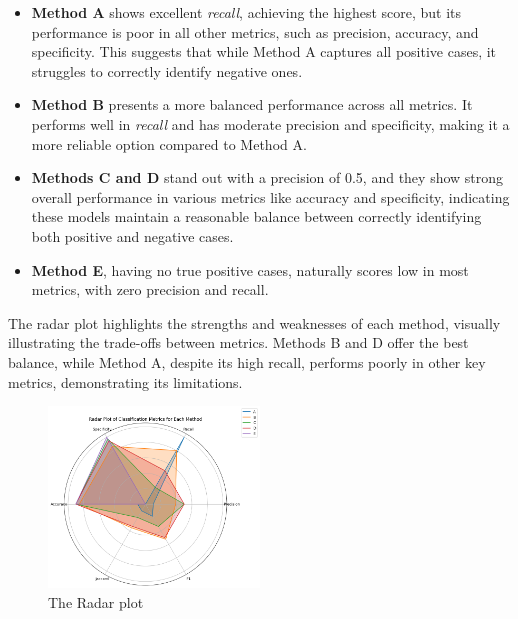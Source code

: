 \documentclass{llncs}
\begin{document}
\begin{itemize}
	\item \textbf{Method A} shows excellent \textit{recall}, achieving the highest score, but its performance is poor in all other metrics, such as precision, accuracy, and specificity. This suggests that while Method A captures all positive cases, it struggles to correctly identify negative ones.
	
	\item \textbf{Method B} presents a more balanced performance across all metrics. It performs well in \textit{recall} and has moderate precision and specificity, making it a more reliable option compared to Method A.
	
	\item \textbf{Methods C and D} stand out with a precision of 0.5, and they show strong overall performance in various metrics like accuracy and specificity, indicating these models maintain a reasonable balance between correctly identifying both positive and negative cases.
	
	\item \textbf{Method E}, having no true positive cases, naturally scores low in most metrics, with zero precision and recall.
\end{itemize}

The radar plot highlights the strengths and weaknesses of each method, visually illustrating the trade-offs between metrics. Methods B and D offer the best balance, while Method A, despite its high recall, performs poorly in other key metrics, demonstrating its limitations.


\begin{figure}[h!]
	\begin{center}  %
		\includegraphics[width=0.5\textwidth]{images/radar_plot.png}
		\caption{The Radar plot}
		\label{fig:radar}
	\end{center}
\end{figure}
  \vspace{-20pt}
 
\end{document}
